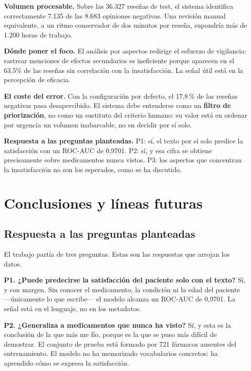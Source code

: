 \documentclass[11pt,a4paper]{article}
\begin{document}
\textbf{Volumen procesable.} Sobre las 36.327 reseñas de test, el sistema
identifica correctamente 7.135 de las 8.683 opiniones negativas. Una revisión
manual equivalente, a un ritmo conservador de dos minutos por reseña,
supondría más de 1.200 horas de trabajo.

\textbf{Dónde poner el foco.} El análisis por aspectos redirige el esfuerzo de
vigilancia: rastrear menciones de efectos secundarios es ineficiente porque
aparecen en el 63,5\% de las reseñas sin correlación con la insatisfacción. La
señal útil está en la percepción de eficacia.

\textbf{El coste del error.} Con la configuración por defecto, el 17,8\,\% de
las reseñas negativas pasa desapercibido. El sistema debe entenderse como un
\textbf{filtro de priorización}, no como un sustituto del criterio humano: su
valor está en ordenar por urgencia un volumen inabarcable, no en decidir por sí
solo.

\textbf{Respuesta a las preguntas planteadas.} P1: sí, el texto por sí solo
predice la satisfacción con un ROC-AUC de 0,9701. P2: sí, y esa cifra se
obtiene precisamente sobre medicamentos nunca vistos. P3: los aspectos que
concentran la insatisfacción no son los esperados, como se ha discutido.

\section{Conclusiones y líneas futuras}

\subsection{Respuesta a las preguntas planteadas}

El trabajo partía de tres preguntas. Estas son las respuestas que arrojan los
datos.

\textbf{P1. ¿Puede predecirse la satisfacción del paciente solo con el texto?}
Sí, y con margen. Sin conocer el medicamento, la condición ni la edad del
paciente —únicamente lo que escribe— el modelo alcanza un ROC-AUC de 0,9701. La
señal está en el lenguaje, no en los metadatos.

\textbf{P2. ¿Generaliza a medicamentos que nunca ha visto?} Sí, y esta es la
conclusión de la que más me fío, porque es la que se puso más difícil de
demostrar. El conjunto de prueba está formado por 721 fármacos ausentes del
entrenamiento. El modelo no ha memorizado vocabularios concretos: ha aprendido
cómo se expresa la satisfacción.
\end{document}
